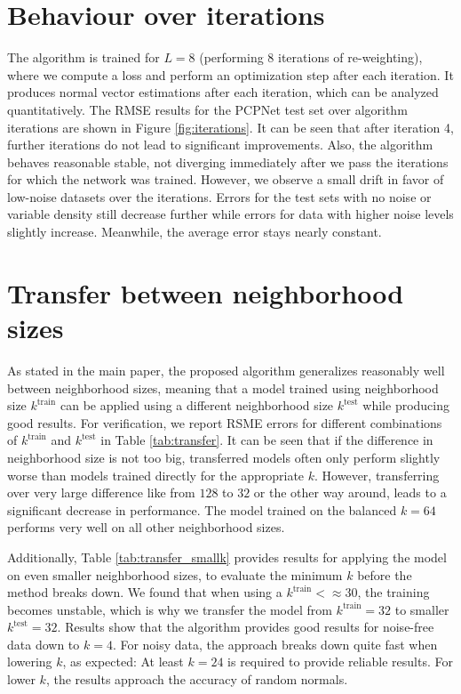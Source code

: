 \documentclass[10pt,twocolumn,letterpaper]{article}
\begin{document}
\section{Behaviour over iterations}
\label{sec:iterations}
The algorithm is trained for $L=8$ (performing $8$ iterations of re-weighting), where we compute a loss and perform an optimization step after each iteration. It produces normal vector estimations after each iteration, which can be analyzed quantitatively. The RMSE results for the PCPNet test set over algorithm iterations are shown in Figure \ref{fig:iterations}. It can be seen that after iteration 4, further iterations do not lead to significant improvements. Also, the algorithm behaves reasonable stable, not diverging immediately after we pass the iterations for which the network was trained. However, we observe a small drift in favor of low-noise datasets over the iterations. Errors for the test sets with no noise or variable density still decrease further while errors for data with higher noise levels slightly increase. Meanwhile, the average error stays nearly constant.





\section{Transfer between neighborhood sizes}
\label{sec:transfer}
As stated in the main paper, the proposed algorithm generalizes reasonably well between neighborhood sizes, meaning that a model trained using neighborhood size $k^{\textrm{train}}$ can be applied using a different neighborhood size $k^{\textrm{test}}$ while producing good results. For verification, we report RSME errors for different combinations of $k^{\textrm{train}}$ and $k^{\textrm{test}}$ in Table \ref{tab:transfer}. It can be seen that if the difference in neighborhood size is not too big, transferred models often only perform slightly worse than models trained directly for the appropriate $k$. However, transferring over very large difference like from $128$ to $32$ or the other way around, leads to a significant decrease in performance. The model trained on the balanced $k=64$ performs very well on all other neighborhood sizes.



Additionally, Table \ref{tab:transfer_smallk} provides results for applying the model on even smaller neighborhood sizes, to evaluate the minimum $k$ before the method breaks down. We found that when using a $k^{\textrm{train}} < \approx 30$, the training becomes unstable, which is why we transfer the model from $k^{\textrm{train}} = 32$ to smaller $k^{\textrm{test}} = 32$. Results show that the algorithm provides good results for noise-free data down to $k=4$. For noisy data, the approach breaks down quite fast when lowering $k$, as expected: At least $k=24$ is required to provide reliable results. For lower $k$, the results approach the accuracy of random normals.
\end{document}
